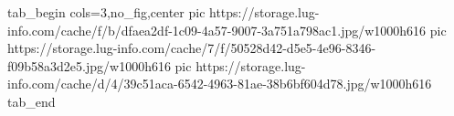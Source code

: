  
 
 
 
 


\ifcmt
  tab_begin cols=3,no_fig,center
     pic https://storage.lug-info.com/cache/f/b/dfaea2df-1c09-4a57-9007-3a751a798ac1.jpg/w1000h616%
		 pic https://storage.lug-info.com/cache/7/f/50528d42-d5e5-4e96-8346-f09b58a3d2e5.jpg/w1000h616%
		 pic https://storage.lug-info.com/cache/d/4/39c51aca-6542-4963-81ae-38b6bf604d78.jpg/w1000h616%
  tab_end
\fi
